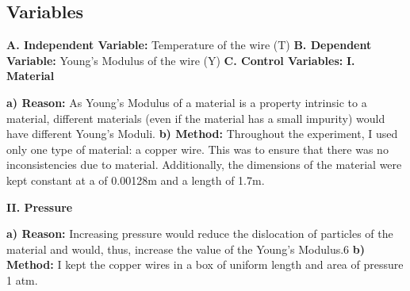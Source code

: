 \documentclass{article}
\begin{document}
\subsection{Variables}

\begin{spacing}{2}
    \par{\vspace{-0.5cm} \hspace{-1.4cm}
    \textbf{A. Independent Variable:} Temperature of the wire (T) \newline
    \textbf{B. Dependent Variable:} Young's Modulus of the wire (Y) \newline
    \textbf{C. Control Variables:} \newline
   \hspace*{1cm} \textbf{I. Material} \newline}
\end{spacing}

\hfill\begin{minipage}{\dimexpr\textwidth-1cm}
\vspace{-1cm}
\par{\textbf{a) Reason:} As Young's Modulus of a material is a property intrinsic to a material, different materials (even if the material has a small impurity) would have different Young's Moduli. \newline
\textbf{b) Method:} Throughout the experiment, I used only one type of material: a copper wire. This was to ensure that there was no inconsistencies due to material. Additionally, the dimensions of the material were kept constant at a of 0.00128m and a length of 1.7m. \newline}
\xdef\tpd{\the\prevdepth}
\end{minipage}

\begin{spacing}{2}
 \textbf{II. Pressure}
\end{spacing}

\hfill\begin{minipage}{\dimexpr\textwidth-1cm}
\par{\textbf{a) Reason:} Increasing pressure would reduce the dislocation of particles of the material and would,
thus, increase the value of the Young’s Modulus.6
 \footnotemark \newline
\textbf{b) Method:} I kept the copper wires in a box of uniform length and area of pressure 1 atm.\newline}
\xdef\tpd{\the\prevdepth}
\end{minipage}
\end{document}
